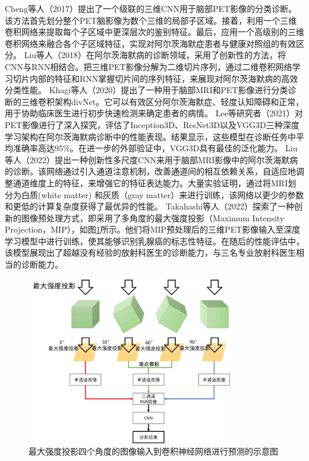 Cheng等人\cite{cheng2017classification}（2017）提出了一个级联的三维CNN用于脑部PET影像的分类诊断。该方法首先划分整个PET脑影像为数个三维的局部子区域。接着，利用一个三维卷积网络来提取每个子区域中更深层次的鉴别特征。最后，应用一个高级别的三维卷积网络来融合各个子区域特征，实现对阿尔茨海默症患者与健康对照组的有效区分。
Liu等人\cite{liu2018classification}（2018）在阿尔茨海默病的诊断领域，采用了创新性的方法，将CNN与RNN相结合。把三维PET影像分解为二维切片序列，通过二维卷积网络学习切片内部的特征和RNN掌握切片间的序列特征，来展现对阿尔茨海默病的高效分类性能。
Khagi等人\cite{khagi2020cnn}（2020）提出了一种用于脑部MRI和PET影像进行分类诊断的三维卷积架构divNet。它可以有效区分阿尔茨海默症、轻度认知障碍和正常，用于协助临床医生进行初步快速检测来确定患者的病情。
Lee等研究者\cite{lee2021performance}（2021）对PET影像进行了深入探究，评估了Inception3D、ResNet3D以及VGG3D三种深度学习架构在阿尔茨海默病诊断中的性能表现。结果显示，这些模型在诊断任务中平均准确率高达95\%。在进一步的外部验证中，VGG3D具有最佳的泛化能力。
Liu等人\cite{liu2022diagnosis}（2022）提出一种创新性多尺度CNN来用于脑部MRI影像中的阿尔茨海默病的诊断。该网络通过引入通道注意机制，改善通道间的相互依赖关系，自适应地调整通道维度上的特征，来增强它的特征表达能力。大量实验证明，通过将MRI划分为白质(white matter) 和灰质（gray matter）来进行训练，该网络以更少的参数和更低的计算复杂度获得了最优异的性能。
Takahashi等人\cite{takahashi2022deep}（2022）探索了一种创新的图像预处理方式，即采用了多角度的最大强度投影（Maximum Intensity Projection，MIP），如图\ref{fig:chap02_mip}所示。他们将MIP预处理后的三维PET影像输入至深度学习模型中进行训练，使其能够识别乳腺癌的标志性特征。在随后的性能评估中，该模型展现出了超越没有经验的放射科医生的诊断能力，与三名专业放射科医生相当的诊断能力。

\begin{figure}[htbp]
  \centering
  \includegraphics[width=0.8\textwidth]{figures/chap02_mip.jpg}
  \caption{最大强度投影四个角度的图像输入到卷积神经网络进行预测的示意图}
  \label{fig:chap02_mip}
\end{figure}

